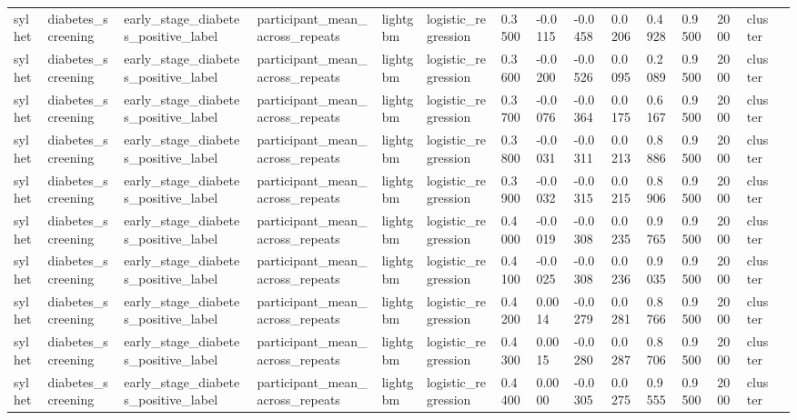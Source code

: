 \begin{tabular}{lllllllllllllll}
sylhet & diabetes\_screening & early\_stage\_diabetes\_positive\_label & participant\_mean\_across\_repeats & lightgbm & logistic\_regression & 0.3500 & -0.0115 & -0.0458 & 0.0206 & 0.4928 & 0.9500 & 2000 & cluster &  \\
sylhet & diabetes\_screening & early\_stage\_diabetes\_positive\_label & participant\_mean\_across\_repeats & lightgbm & logistic\_regression & 0.3600 & -0.0200 & -0.0526 & 0.0095 & 0.2089 & 0.9500 & 2000 & cluster &  \\
sylhet & diabetes\_screening & early\_stage\_diabetes\_positive\_label & participant\_mean\_across\_repeats & lightgbm & logistic\_regression & 0.3700 & -0.0076 & -0.0364 & 0.0175 & 0.6167 & 0.9500 & 2000 & cluster &  \\
sylhet & diabetes\_screening & early\_stage\_diabetes\_positive\_label & participant\_mean\_across\_repeats & lightgbm & logistic\_regression & 0.3800 & -0.0031 & -0.0311 & 0.0213 & 0.8886 & 0.9500 & 2000 & cluster &  \\
sylhet & diabetes\_screening & early\_stage\_diabetes\_positive\_label & participant\_mean\_across\_repeats & lightgbm & logistic\_regression & 0.3900 & -0.0032 & -0.0315 & 0.0215 & 0.8906 & 0.9500 & 2000 & cluster &  \\
sylhet & diabetes\_screening & early\_stage\_diabetes\_positive\_label & participant\_mean\_across\_repeats & lightgbm & logistic\_regression & 0.4000 & -0.0019 & -0.0308 & 0.0235 & 0.9765 & 0.9500 & 2000 & cluster &  \\
sylhet & diabetes\_screening & early\_stage\_diabetes\_positive\_label & participant\_mean\_across\_repeats & lightgbm & logistic\_regression & 0.4100 & -0.0025 & -0.0308 & 0.0236 & 0.9035 & 0.9500 & 2000 & cluster &  \\
sylhet & diabetes\_screening & early\_stage\_diabetes\_positive\_label & participant\_mean\_across\_repeats & lightgbm & logistic\_regression & 0.4200 & 0.0014 & -0.0279 & 0.0281 & 0.8766 & 0.9500 & 2000 & cluster &  \\
sylhet & diabetes\_screening & early\_stage\_diabetes\_positive\_label & participant\_mean\_across\_repeats & lightgbm & logistic\_regression & 0.4300 & 0.0015 & -0.0280 & 0.0287 & 0.8706 & 0.9500 & 2000 & cluster &  \\
sylhet & diabetes\_screening & early\_stage\_diabetes\_positive\_label & participant\_mean\_across\_repeats & lightgbm & logistic\_regression & 0.4400 & 0.0000 & -0.0305 & 0.0275 & 0.9555 & 0.9500 & 2000 & cluster &  \\

\end{tabular}
